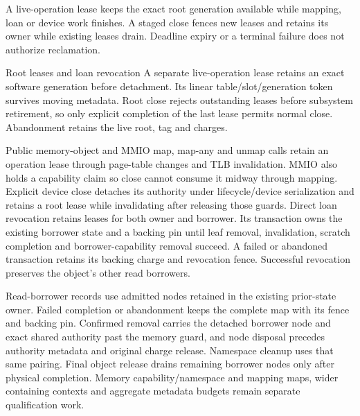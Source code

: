 A live-operation lease keeps the exact root generation available while mapping,
loan or device work finishes. A staged close fences new leases and retains its
owner while existing leases drain. Deadline expiry or a terminal failure does
not authorize reclamation.

\begin{implementationdetail}{Root leases and loan revocation}
A separate live-operation lease retains an exact software generation before
detachment. Its linear table/slot/generation token survives moving metadata.
Root close rejects outstanding leases before subsystem retirement, so only explicit
completion of the last lease permits normal close. Abandonment retains the live
root, tag and charges.

Public memory-object and MMIO map, map-any and unmap calls retain an operation
lease through page-table changes and TLB invalidation. MMIO also holds a
capability claim so close cannot consume it midway through mapping. Explicit
device close detaches its authority under lifecycle/device serialization and
retains a root lease while invalidating after releasing those guards. Direct
loan revocation retains leases for both owner and borrower. Its transaction owns
the existing borrower state and a backing pin until leaf removal, invalidation,
scratch completion and borrower-capability removal succeed. A failed or
abandoned transaction retains its backing charge and revocation fence.
Successful revocation preserves the object's other read borrowers.

Read-borrower records use admitted nodes retained in the existing prior-state
owner. Failed completion or abandonment keeps the complete map with its fence
and backing pin. Confirmed removal carries the detached borrower node and exact
shared authority past the memory guard, and node disposal precedes authority metadata
and original charge release. Namespace cleanup uses that same pairing. Final
object release drains remaining borrower nodes only after physical completion.
Memory capability/namespace and mapping maps, wider containing contexts and
aggregate metadata budgets remain separate qualification work.
\end{implementationdetail}

